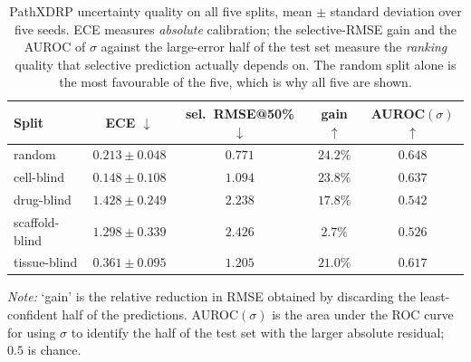 \begin{table}[!h]
\centering\small
\caption{PathXDRP uncertainty quality on all five splits, mean $\pm$
standard deviation over five seeds. ECE measures \emph{absolute}
calibration; the selective-RMSE gain and the AUROC of $\sigma$ against
the large-error half of the test set measure the \emph{ranking} quality
that selective prediction actually depends on. The random split
alone is the most favourable of the five, which is why all five
are shown.}
\label{tab:calibration_all_splits}
\begin{tabular*}{\columnwidth}{@{\extracolsep{\fill}}lcccc@{}}
\toprule
\textbf{Split} & \textbf{ECE} $\downarrow$ & \textbf{sel.\ RMSE@50\%} $\downarrow$ & \textbf{gain} $\uparrow$ & \textbf{AUROC}$(\sigma)$ $\uparrow$ \\
\midrule
random & $0.213{\pm}0.048$ & $0.771$ & $24.2\%$ & $0.648$ \\
cell-blind & $0.148{\pm}0.108$ & $1.094$ & $23.8\%$ & $0.637$ \\
drug-blind & $1.428{\pm}0.249$ & $2.238$ & $17.8\%$ & $0.542$ \\
scaffold-blind & $1.298{\pm}0.339$ & $2.426$ & $2.7\%$ & $0.526$ \\
tissue-blind & $0.361{\pm}0.095$ & $1.205$ & $21.0\%$ & $0.617$ \\
\bottomrule
\end{tabular*}

\smallskip
\footnotesize\emph{Note:} `gain' is the relative reduction in RMSE
obtained by discarding the least-confident half of the predictions.
AUROC$(\sigma)$ is the area under the ROC curve for using $\sigma$ to
identify the half of the test set with the larger absolute residual;
$0.5$ is chance.
\end{table}